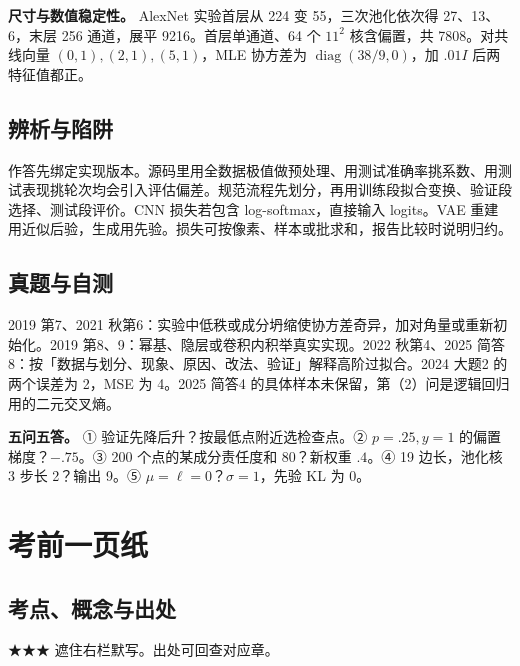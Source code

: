 \documentclass[UTF8,a4paper,zihao=-4,fontset=fandol]{ctexart}
\begin{document}
\textbf{尺寸与数值稳定性。} AlexNet 实验首层从 224 变 55，三次池化依次得 27、13、6，末层 256 通道，展平 9216。首层单通道、64 个 $11^2$ 核含偏置，共 7808。对共线向量 $(0,1),(2,1),(5,1)$，MLE 协方差为 $\operatorname{diag}(38/9,0)$，加 $.01I$ 后两特征值都正。

\subsection{辨析与陷阱}
作答先绑定实现版本。源码里用全数据极值做预处理、用测试准确率挑系数、用测试表现挑轮次均会引入评估偏差。规范流程先划分，再用训练段拟合变换、验证段选择、测试段评价。CNN 损失若包含 log-softmax，直接输入 logits。VAE 重建用近似后验，生成用先验。损失可按像素、样本或批求和，报告比较时说明归约。

\subsection{真题与自测}
2019 第7、2021 秋第6：实验中低秩或成分坍缩使协方差奇异，加对角量或重新初始化。2019 第8、9：幂基、隐层或卷积内积举真实实现。2022 秋第4、2025 简答8：按「数据与划分、现象、原因、改法、验证」解释高阶过拟合。2024 大题2 的两个误差为 2，MSE 为 4。2025 简答4 的具体样本未保留，第（2）问是逻辑回归用的二元交叉熵。

\textbf{五问五答。} ① 验证先降后升？按最低点附近选检查点。② $p=.25,y=1$ 的偏置梯度？$-.75$。③ 200 个点的某成分责任度和 80？新权重 $.4$。④ 19 边长，池化核 3 步长 2？输出 9。⑤ $\mu=\ell=0$？$\sigma=1$，先验 KL 为 0。

\clearpage
\section{考前一页纸}
\small
{}
\setlength{\parskip}{.12em}

\subsection{考点、概念与出处}
★★★ 遮住右栏默写。出处可回查对应章。
\end{document}
